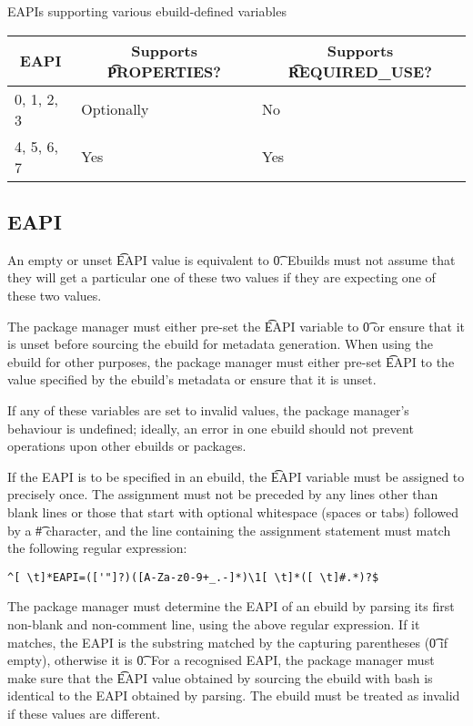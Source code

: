 \begin{centertable}{EAPIs supporting various ebuild-defined variables}
    \label{tab:optional-vars-table}
    \begin{tabular}{lll}
      \toprule
      \multicolumn{1}{c}{\textbf{EAPI}} &
      \multicolumn{1}{c}{\textbf{Supports \t{PROPERTIES}?}} &
      \multicolumn{1}{c}{\textbf{Supports \t{REQUIRED_USE}?}} \\
      \midrule
      0, 1, 2, 3        & Optionally & No  \\
      4, 5, 6, 7        & Yes        & Yes \\
      \bottomrule
    \end{tabular}
\end{centertable}

\subsection{EAPI}
\label{sec:eapi}

An empty or unset \t{EAPI} value is equivalent to \t{0}. Ebuilds must not assume that they will get
a particular one of these two values if they are expecting one of these two values.

The package manager must either pre-set the \t{EAPI} variable to \t{0} or ensure that it is unset
before sourcing the ebuild for metadata generation. When using the ebuild for other purposes, the
package manager must either pre-set \t{EAPI} to the value specified by the ebuild's metadata or
ensure that it is unset.

If any of these variables are set to invalid values, the package manager's behaviour is undefined;
ideally, an error in one ebuild should not prevent operations upon other ebuilds or packages.

If the EAPI is to be specified in an ebuild, the \t{EAPI} variable must be assigned to precisely
once. The assignment must not be preceded by any lines other than blank lines or those that start
with optional whitespace (spaces or tabs) followed by a \t{\#} character, and the line containing
the assignment statement must match the following regular expression:
\begin{verbatim}
^[ \t]*EAPI=(['"]?)([A-Za-z0-9+_.-]*)\1[ \t]*([ \t]#.*)?$
\end{verbatim}

The package manager must determine the EAPI of an ebuild by parsing its first non-blank and
non-comment line, using the above regular expression. If it matches, the EAPI is the substring
matched by the capturing parentheses (\t{0} if empty), otherwise it is \t{0}. For a recognised
EAPI, the package manager must make sure that the \t{EAPI} value obtained by sourcing the ebuild
with bash is identical to the EAPI obtained by parsing. The ebuild must be treated as invalid if
these values are different.

